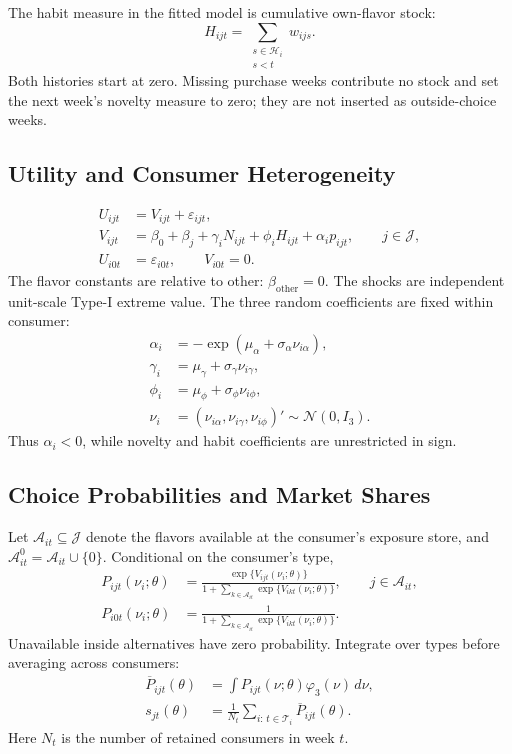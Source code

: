 \documentclass[12pt]{article}
\theoremstyle{definition}
\theoremstyle{remark}
\begin{document}
The habit measure in the fitted model is cumulative own-flavor stock:
\begin{equation}
 H_{ijt}=\sum_{\substack{s\in\mathcal H_i\\s<t}}w_{ijs}.
 \label{eq:empirical-habit}
\end{equation}
Both histories start at zero. Missing purchase weeks contribute no stock and
set the next week's novelty measure to zero; they are not inserted as outside-choice weeks.

\subsection{Utility and Consumer Heterogeneity}
\begin{align}
 U_{ijt}&=V_{ijt}+\varepsilon_{ijt},\\
 V_{ijt}&=\beta_0+\beta_j+\gamma_iN_{ijt}+\phi_iH_{ijt}+\alpha_i p_{ijt},
 \qquad j\in\mathcal J,
 \label{eq:utility}\\
 U_{i0t}&=\varepsilon_{i0t},\qquad V_{i0t}=0.
\end{align}
The flavor constants are relative to other: $\beta_{\mathrm{other}}=0$.
The shocks are independent unit-scale Type-I extreme value.
The three random coefficients are fixed within consumer:
\begin{align}
 \alpha_i&=-\exp(\mu_\alpha+\sigma_\alpha\nu_{i\alpha}),\\
 \gamma_i&=\mu_\gamma+\sigma_\gamma\nu_{i\gamma},\\
 \phi_i&=\mu_\phi+\sigma_\phi\nu_{i\phi},\\
 \nu_i&=(\nu_{i\alpha},\nu_{i\gamma},\nu_{i\phi})'
 \sim\mathcal N(0,I_3).
\end{align}
Thus $\alpha_i<0$, while novelty and habit coefficients are unrestricted in sign.

\subsection{Choice Probabilities and Market Shares}
Let $\mathcal A_{it}\subseteq\mathcal J$ denote the flavors available at the
consumer's exposure store, and $\mathcal A_{it}^0=\mathcal A_{it}\cup\{0\}$.
Conditional on the consumer's type,
\begin{align}
 P_{ijt}(\nu_i;\theta)
 &=\frac{\exp\{V_{ijt}(\nu_i;\theta)\}}
 {1+\sum_{k\in\mathcal A_{it}}\exp\{V_{ikt}(\nu_i;\theta)\}},
 \qquad j\in\mathcal A_{it},
 \label{eq:choice-probability}\\
 P_{i0t}(\nu_i;\theta)
 &=\frac{1}{1+\sum_{k\in\mathcal A_{it}}\exp\{V_{ikt}(\nu_i;\theta)\}}.
\end{align}
Unavailable inside alternatives have zero probability.
Integrate over types before averaging across consumers:
\begin{align}
 \overline P_{ijt}(\theta)
 &=\int P_{ijt}(\nu;\theta)\varphi_3(\nu)\,d\nu,\\
 s_{jt}(\theta)&=\frac{1}{N_t}\sum_{i:\,t\in\mathcal T_i}\overline P_{ijt}(\theta).
\end{align}
Here $N_t$ is the number of retained consumers in week $t$.
\end{document}
